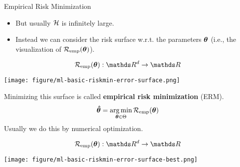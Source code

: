 \documentclass[11pt,compress,t,notes=noshow, xcolor=table]{beamer}
\begin{document}
\begin{vbframe}{Empirical Risk Minimization}

\begin{itemize}

    \item But usually $\mathcal{H}$ is infinitely large. 
    \item Instead we can consider the risk surface w.r.t. the parameters $\bm{\theta}$ (i.e., the visualization of $\mathcal{R}_{\text{emp}}(\bm{\theta})$).
\end{itemize}

\begin{table}
\begin{minipage}{0.4\linewidth}
$$\risket : \R^d \to \R$$
\end{minipage}\hfill
	\begin{minipage}{0.55\linewidth}
\texttt{[image: figure/ml-basic-riskmin-error-surface.png]}
\end{minipage}
\end{table}


\framebreak

Minimizing this surface is called \textbf{empirical risk minimization} (ERM).
$$
\bm{\hat\theta} = \operatorname*{arg\,min}_{\bm{\theta} \in \Theta} \mathcal{R}_{\text{emp}}(\bm{\theta})
$$
Usually we do this by numerical optimization.

\begin{table}
\begin{minipage}{0.4\linewidth}
$$\risket : \R^d \to \R$$
\end{minipage}\hfill
	\begin{minipage}{0.55\linewidth}
\texttt{[image: figure/ml-basic-riskmin-error-surface-best.png]}
\end{minipage}
\end{table}


\end{vbframe}
\end{document}
